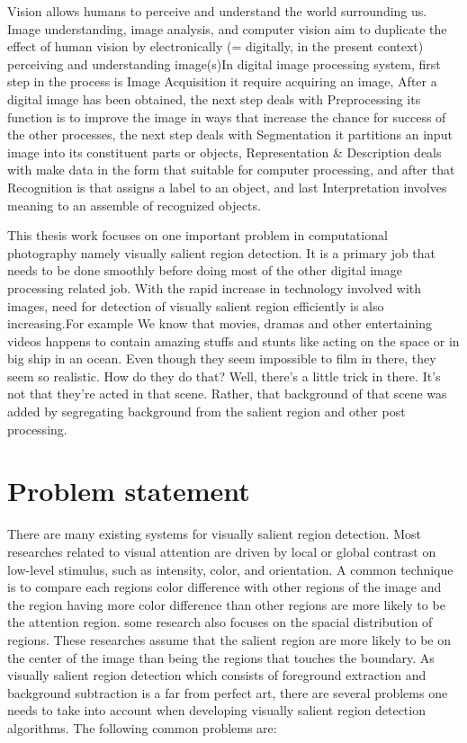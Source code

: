 Vision allows humans to perceive and understand the world surrounding us. Image understanding, image analysis, and computer vision aim to duplicate the effect of human vision by electronically (= digitally, in the present context) perceiving and understanding image(s)In digital image processing system, first step in the process is Image Acquisition it require acquiring an image, After a digital image has been obtained, the next step deals with Preprocessing its function is to improve the image in ways that increase the chance for success of the other processes, the next step deals with Segmentation it partitions an input image into its constituent parts or objects, Representation & Description deals with make data in the form that suitable for computer processing, and after that Recognition is that assigns a label to an object, and last Interpretation involves meaning to an assemble of recognized objects.

This thesis work focuses on one important problem in computational photography namely visually salient region detection. It is a primary job that needs to be done smoothly before doing most of the other digital image processing related job. With the rapid increase in technology involved with images, need for detection of visually salient region efficiently is also increasing.For example We know that movies, dramas and other entertaining videos happens to contain amazing stuffs and stunts like acting on the space or in big ship in an ocean. Even though they seem impossible to film in there, they seem so realistic. How do they do that? Well, there’s a little trick in there. It’s not that they’re acted in that scene. Rather, that background of that scene was added by segregating background from the salient region and other post processing. 


 



\section{Problem statement}
There are many existing systems for visually salient region detection. Most researches related to visual attention are driven by local or global contrast on low-level stimulus, such as intensity, color, and orientation.
A common technique is to compare each regions color difference with other regions of the image and the region having more color difference than other regions are more likely to be the attention region.
some research also focuses on the spacial distribution of regions. These researches assume that the salient region are more likely to be on the center of the image than being the regions that touches the boundary.
As visually salient region detection which consists of foreground extraction and background subtraction is a far from perfect art, there are several problems one needs to take into account when developing visually salient region detection algorithms. The following common problems are:

